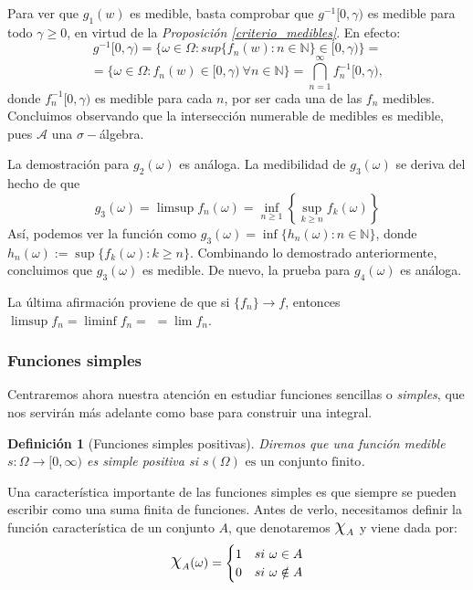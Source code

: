 \documentclass[11pt, a4paper]{article}
\makeatletter
\newif\IfInSansMode
\let\oldsf\sffamily
\renewcommand*{\sffamily}{\oldsf\mathversion{sans}\InSansModetrue}
\let\oldnorm\normalfont
\renewcommand*{\normalfont}{\oldnorm\InSansModefalse\mathversion{normal}}
\newcommand{\fn}{\{f_n\}}
\DeclareRobustCommand{\rchi}{{\Large \mathpalette\irchi\relax}}
\newcommand{\irchi}[2]{\raisebox{0.4\depth}{$#1\chi$}} %
\renewenvironment{proof}[1][\proofname] {\par\pushQED{\qed}\normalfont\topsep6\p@\@plus6\p@\relax\trivlist\item[\hskip\labelsep\itshape\sffamily#1\@addpunct{.}]\ignorespaces}{\popQED\endtrivlist\@endpefalse}
\theoremstyle{theorem-style}
\theoremstyle{definition-style}
\newtheorem{ndef}{Definición}[section]
\theoremstyle{remark-style}
\theoremstyle{example-style}
\makeatother
\begin{document}
  \begin{proof}
	Para ver que $g_1(w)$ es medible, basta comprobar que $g^{-1}[0,\gamma)$ es medible para todo $\gamma \ge 0$, en virtud de la \textit{Proposición \ref{criterio_medibles}}. En efecto: $$g^{-1}[0,\gamma) = \{\omega \in \Omega : sup\{f_n(w) : n \in \mathbb{N}\} \in [0,\gamma)\} =$$  $$ = \{ \omega \in \Omega : f_n(w) \in [0,\gamma) \ \forall n \in \mathbb{N}\} = \bigcap_{n=1}^{\infty} f_n^{-1}[0,\gamma), $$ donde $f_n^{-1}[0,\gamma)$ es medible para cada $n$, por ser cada una de las $f_n$ medibles. Concluimos observando que la intersección numerable de medibles es medible, pues $\mathscr A$ una $\sigma-$álgebra.
	
	La demostración para $g_2(\omega)$ es análoga. La medibilidad de $g_3(\omega)$ se deriva del hecho de que $$g_3(\omega) = \limsup f_n(\omega) = \inf_{n \ge 1} \left\{\sup_{k\ge n} f_k(\omega) \right\}$$ Así, podemos ver la función como $g_3(\omega) = \inf \{h_n(\omega) : n \in \mathbb{N}\}$, donde $h_n(\omega) := \sup \{f_k(\omega) : k \ge n\}$. Combinando lo demostrado anteriormente, concluimos que $g_3(\omega)$ es medible. De nuevo, la prueba para $g_4(\omega)$ es análoga.
	
La última afirmación proviene de que si $\fn \to f$, entonces $\limsup f_n = \liminf f_n =$ $=\lim f_n$.
\end{proof}



\subsubsection{Funciones simples}

Centraremos ahora nuestra atención en estudiar funciones sencillas o \textit{simples}, que nos servirán más adelante como base para construir una integral.

\begin{ndef}[Funciones simples positivas]
  Diremos que una función medible $s: \Omega \to [0,\infty)$ es simple positiva si 
  $s(\Omega) \text{ es un conjunto finito}$.
\end{ndef}

Una característica importante de las funciones simples es que siempre se pueden escribir como una suma finita de funciones. Antes de verlo, necesitamos definir la función característica de un conjunto $A$, que denotaremos $\rchi_A$ y viene dada por:
\[
  \rchi_A(\omega)= \begin{cases}
    1 & si \ \omega \in A\\
    0 & si \ \omega \notin A
  \end{cases}
\]
\end{document}
